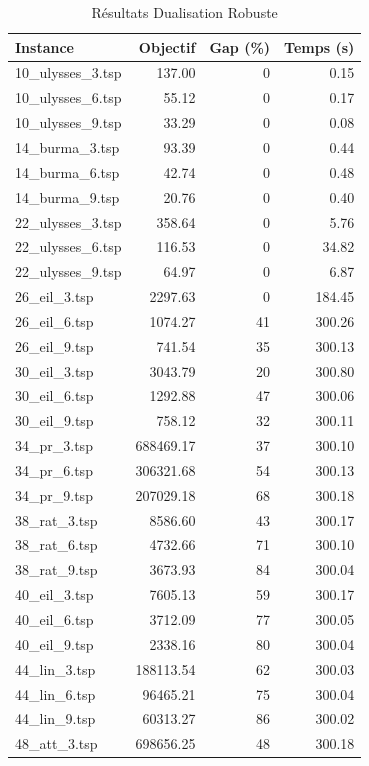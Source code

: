 \begin{table}[H]
\centering
\caption{Résultats Dualisation Robuste}
\small
\begin{tabular}{|l|r|r|r|}
\hline
\textbf{Instance} & \textbf{Objectif} & \textbf{Gap (\%)} & \textbf{Temps (s)} \\
\hline
10\_ulysses\_3.tsp & 137.00 & 0 & 0.15 \\
10\_ulysses\_6.tsp & 55.12 & 0 & 0.17 \\
10\_ulysses\_9.tsp & 33.29 & 0 & 0.08 \\
14\_burma\_3.tsp & 93.39 & 0 & 0.44 \\
14\_burma\_6.tsp & 42.74 & 0 & 0.48 \\
14\_burma\_9.tsp & 20.76 & 0 & 0.40 \\
22\_ulysses\_3.tsp & 358.64 & 0 & 5.76 \\
22\_ulysses\_6.tsp & 116.53 & 0 & 34.82 \\
22\_ulysses\_9.tsp & 64.97 & 0 & 6.87 \\
26\_eil\_3.tsp & 2297.63 & 0 & 184.45 \\
26\_eil\_6.tsp & 1074.27 & 41 & 300.26 \\
26\_eil\_9.tsp & 741.54 & 35 & 300.13 \\
30\_eil\_3.tsp & 3043.79 & 20 & 300.80 \\
30\_eil\_6.tsp & 1292.88 & 47 & 300.06 \\
30\_eil\_9.tsp & 758.12 & 32 & 300.11 \\
34\_pr\_3.tsp & 688469.17 & 37 & 300.10 \\
34\_pr\_6.tsp & 306321.68 & 54 & 300.13 \\
34\_pr\_9.tsp & 207029.18 & 68 & 300.18 \\
38\_rat\_3.tsp & 8586.60 & 43 & 300.17 \\
38\_rat\_6.tsp & 4732.66 & 71 & 300.10 \\
38\_rat\_9.tsp & 3673.93 & 84 & 300.04 \\
40\_eil\_3.tsp & 7605.13 & 59 & 300.17 \\
40\_eil\_6.tsp & 3712.09 & 77 & 300.05 \\
40\_eil\_9.tsp & 2338.16 & 80 & 300.04 \\
44\_lin\_3.tsp & 188113.54 & 62 & 300.03 \\
44\_lin\_6.tsp & 96465.21 & 75 & 300.04 \\
44\_lin\_9.tsp & 60313.27 & 86 & 300.02 \\
48\_att\_3.tsp & 698656.25 & 48 & 300.18 \\

\end{tabular}
\end{table}
